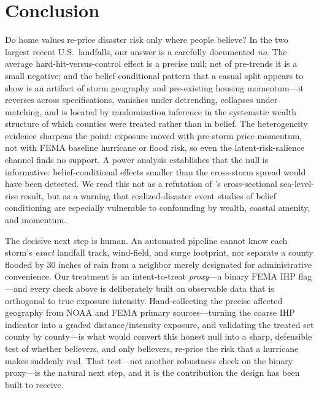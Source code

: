 \documentclass[12pt]{article}
\begin{document}
\section{Conclusion}\label{sec:concl}
Do home values re-price disaster risk only where people believe? In the two largest recent
U.S.\ landfalls, our answer is a carefully documented \emph{no}. The average
hard-hit-versus-control effect is a precise null; net of pre-trends it is a small negative;
and the belief-conditional pattern that a casual split appears to show is an artifact of storm
geography and pre-existing housing momentum---it reverses across specifications, vanishes under
detrending, collapses under matching, and is located by randomization inference in the
systematic wealth structure of which counties were treated rather than in belief. The
heterogeneity evidence sharpens the point: exposure moved with pre-storm price momentum, not with
FEMA baseline hurricane or flood risk, so even the latent-risk-salience channel finds no support.
A power analysis establishes that the null is informative: belief-conditional effects smaller than
the cross-storm spread would have been detected. We read this not as a refutation of
\citet{baldauf2020}'s cross-sectional sea-level-rise result, but as a warning that
realized-disaster event studies of belief conditioning are especially vulnerable to confounding
by wealth, coastal amenity, and momentum.

The decisive next step is human. An automated pipeline cannot know each storm's \emph{exact}
landfall track, wind-field, and surge footprint, nor separate a county flooded by 30 inches
of rain from a neighbor merely designated for administrative convenience. Our treatment is an
intent-to-treat \emph{proxy}---a binary FEMA IHP flag---and every check above is deliberately
built on observable data that is orthogonal to true exposure intensity. Hand-collecting the
precise affected geography from NOAA and FEMA primary sources---turning the coarse IHP indicator
into a graded distance/intensity exposure, and validating the treated set county by county---is
what would convert this honest null into a sharp, defensible test of whether believers, and only
believers, re-price the risk that a hurricane makes suddenly real. That test---not another
robustness check on the binary proxy---is the natural next step, and it is the contribution the
design has been built to receive.
\end{document}
